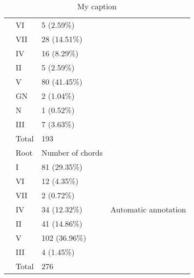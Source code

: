 \begin{table}[]
\begin{tabular}{llll}
 & VI & 5 (2.59\%) &  \\
 & VII & 28 (14.51\%) &  \\
 & IV & 16 (8.29\%) &  \\
 & II & 5 (2.59\%) &  \\
 & V & 80 (41.45\%) &  \\
 & GN & 2 (1.04\%) &  \\
 & N & 1 (0.52\%) &  \\
 & III & 7 (3.63\%) &  \\
 & Total & 193 &  \\
 & Root & Number of chords & \multirow{9}{*}{Automatic annotation} \\
 & I & 81 (29.35\%) &  \\
 & VI & 12 (4.35\%) &  \\
 & VII & 2 (0.72\%) &  \\
 & IV & 34 (12.32\%) &  \\
 & II & 41 (14.86\%) &  \\
 & V & 102 (36.96\%) &  \\
 & III & 4 (1.45\%) &  \\
 & Total & 276 &
\end{tabular}
\caption{My caption}
\label{my-label}
\end{table}

\newpage
